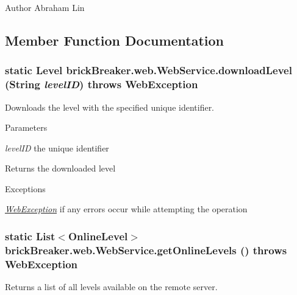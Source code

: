 \begin{DoxyAuthor}{Author}
Abraham Lin 
\end{DoxyAuthor}


\subsection{Member Function Documentation}
\hypertarget{classbrick_breaker_1_1web_1_1_web_service_a7b62956bb6e061279fc3e3223a2b0d60}{
\subsubsection[{downloadLevel}]{\setlength{\rightskip}{0pt plus 5cm}static {\bf Level} brickBreaker.web.WebService.downloadLevel (String {\em levelID})  throws {\bf WebException} }}
\label{classbrick_breaker_1_1web_1_1_web_service_a7b62956bb6e061279fc3e3223a2b0d60}
Downloads the level with the specified unique identifier.


\begin{DoxyParams}{Parameters}
\item[{\em levelID}]the unique identifier \end{DoxyParams}
\begin{DoxyReturn}{Returns}
the downloaded level
\end{DoxyReturn}

\begin{DoxyExceptions}{Exceptions}
\item[{\em \hyperlink{classbrick_breaker_1_1web_1_1_web_exception}{WebException}}]if any errors occur while attempting the operation \end{DoxyExceptions}
\hypertarget{classbrick_breaker_1_1web_1_1_web_service_af93134d4498f18f2483593520017f069}{
\subsubsection[{getOnlineLevels}]{\setlength{\rightskip}{0pt plus 5cm}static List$<${\bf OnlineLevel}$>$ brickBreaker.web.WebService.getOnlineLevels ()  throws {\bf WebException} }}
\label{classbrick_breaker_1_1web_1_1_web_service_af93134d4498f18f2483593520017f069}
Returns a list of all levels available on the remote server.

